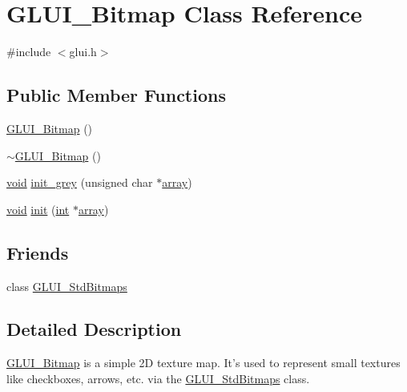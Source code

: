 \hypertarget{class_g_l_u_i___bitmap}{\section{G\+L\+U\+I\+\_\+\+Bitmap Class Reference}
\label{class_g_l_u_i___bitmap}
}


{\ttfamily \#include $<$glui.\+h$>$}

\subsection*{Public Member Functions}
\begin{DoxyCompactItemize}
\item 
\hyperlink{class_g_l_u_i___bitmap_a5074c49b991fc949a229ec520eab208f}{G\+L\+U\+I\+\_\+\+Bitmap} ()
\item 
\hyperlink{class_g_l_u_i___bitmap_a6fdad2b88cc56835afe6ebb1bb87d89f}{$\sim$\+G\+L\+U\+I\+\_\+\+Bitmap} ()
\item 
\hyperlink{wglext_8h_a9e6b7f1933461ef318bb000d6bd13b83}{void} \hyperlink{class_g_l_u_i___bitmap_a329b8c9e64d0a5df4d1cc657ed379075}{init\+\_\+grey} (unsigned char $\ast$\hyperlink{glext_8h_a52f38e7d822a46377fde7a02708eedb1}{array})
\item 
\hyperlink{wglext_8h_a9e6b7f1933461ef318bb000d6bd13b83}{void} \hyperlink{class_g_l_u_i___bitmap_aac85d978c45e38395bbf504ad8abd9a9}{init} (\hyperlink{wglext_8h_a500a82aecba06f4550f6849b8099ca21}{int} $\ast$\hyperlink{glext_8h_a52f38e7d822a46377fde7a02708eedb1}{array})
\end{DoxyCompactItemize}
\subsection*{Friends}
\begin{DoxyCompactItemize}
\item 
class \hyperlink{class_g_l_u_i___bitmap_aa9d1e2d4b5b5b9d0c2512496f768ecf4}{G\+L\+U\+I\+\_\+\+Std\+Bitmaps}
\end{DoxyCompactItemize}


\subsection{Detailed Description}
\hyperlink{class_g_l_u_i___bitmap}{G\+L\+U\+I\+\_\+\+Bitmap} is a simple 2\+D texture map. It's used to represent small textures like checkboxes, arrows, etc. via the \hyperlink{class_g_l_u_i___std_bitmaps}{G\+L\+U\+I\+\_\+\+Std\+Bitmaps} class. 

